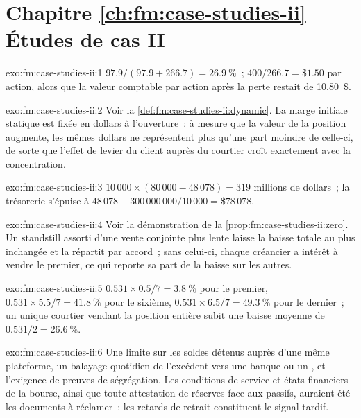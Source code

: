 \section*{Chapitre \ref{ch:fm:case-studies-ii} --- Études de cas II}

\begin{solution}{exo:fm:case-studies-ii:1}
$97.9/(97.9+266.7)=26.9~\%$~; $400/266.7=\$1.50$ par action, alors que la valeur comptable par action après la perte restait de 10.80~\$.
\end{solution}

\begin{solution}{exo:fm:case-studies-ii:2}
Voir la \cref{def:fm:case-studies-ii:dynamic}. La marge initiale statique est fixée en dollars à l'ouverture~: à mesure que la valeur de la position augmente, les mêmes dollars
ne représentent plus qu'une part moindre de celle-ci, de sorte que l'effet de levier du client auprès du courtier croît exactement avec la concentration.
\end{solution}

\begin{solution}{exo:fm:case-studies-ii:3}
$10\,000\times(80\,000-48\,078)=319$ millions de dollars~; la trésorerie s'épuise à $48\,078+300\,000\,000/10\,000=\$78\,078$.
\end{solution}

\begin{solution}{exo:fm:case-studies-ii:4}
Voir la démonstration de la \cref{prop:fm:case-studies-ii:zero}. Un standstill assorti d'une vente conjointe plus lente laisse la baisse totale au plus inchangée et la répartit par
accord~; sans celui-ci, chaque créancier a intérêt à vendre le premier, ce qui reporte sa part de la baisse sur les autres.
\end{solution}

\begin{solution}{exo:fm:case-studies-ii:5}
$0.531\times0.5/7=3.8~\%$ pour le premier, $0.531\times5.5/7=41.8~\%$ pour le sixième, $0.531\times6.5/7=49.3~\%$ pour le dernier~; un unique courtier vendant la
position entière subit une baisse moyenne de $0.531/2=26.6~\%$.
\end{solution}

\begin{solution}{exo:fm:case-studies-ii:6}
Une limite sur les soldes détenus auprès d'une même plateforme, un balayage quotidien de l'excédent vers une banque ou un , et l'exigence de preuves de ségrégation. Les
conditions de service et états financiers de la bourse, ainsi que toute attestation de réserves face aux passifs, auraient été les documents à réclamer~;
les retards de retrait constituent le signal tardif.
\end{solution}

